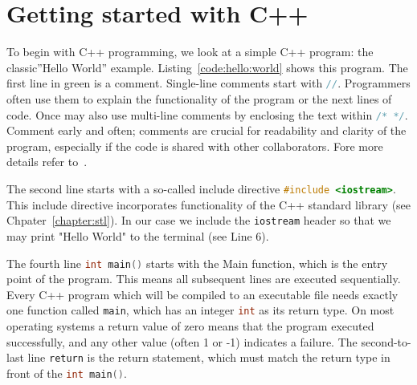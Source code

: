 \section{Getting started with C++}
To begin with C++ programming, we look at a simple C++ program: the classic''Hello World'' example. Listing~\ref{code:hello:world} shows this program. The first line in green is a comment. Single-line comments start with \lstinline[language=C++]|//|. Programmers often use them to explain the functionality of the program or the next lines of code. Once may also use multi-line comments by enclosing the text within \lstinline[language=C++]{/* */}. Comment early and often; comments are crucial for readability and clarity of the program, especially if the code is shared with other collaborators. Fore more details refer to~\cite{kernighan1974elements}.

The second line starts with a so-called include directive \lstinline[language=C++]{#include <iostream>}. This include directive incorporates functionality of the C++ standard library (see Chpater~\ref{chapter:stl}). In our case we include the \lstinline|iostream| header so that we may print "Hello World" to the terminal (see Line 6).

The fourth line \lstinline[language=C++]{int main()} starts with the Main function, which is the entry point of the program. This means all subsequent lines are executed sequentially. Every C++ program which will be compiled to an executable file needs exactly one function called \lstinline[language=C++]|main|, which has an integer \lstinline[language=C++]{int} as its return type. On most operating systems a return value of zero means that the program executed successfully, and any other value (often 1 or -1) indicates a failure. The second-to-last line \lstinline[]|return| is the return statement, which must match the return type in front of the \lstinline[language=C++]{int main()}.




